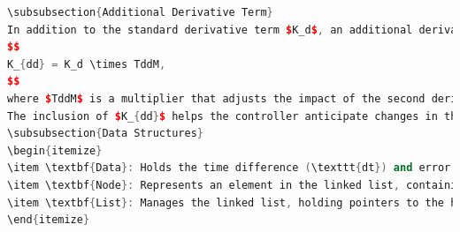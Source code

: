\documentclass[a4paper,12pt]{article}
\begin{document}
\begin{lstlisting}[language=C++]
\subsubsection{Additional Derivative Term}
In addition to the standard derivative term $K_d$, an additional derivative term $K_{dd}$ is included in the PID controller. This term represents a second derivative component, which can be defined as follows:
$$
K_{dd} = K_d \times TddM,
$$
where $TddM$ is a multiplier that adjusts the impact of the second derivative term. \\
The inclusion of $K_{dd}$ helps the controller anticipate changes in the error more effectively. By accounting for the acceleration of the error (i.e., how the rate of error change is itself changing), this additional term enhances the damping characteristics of the controller, allowing for more refined control responses, especially in systems that are subject to rapid changes or oscillations.
\subsubsection{Data Structures}
\begin{itemize}
\item \textbf{Data}: Holds the time difference (\texttt{dt}) and error value (\texttt{e}).
\item \textbf{Node}: Represents an element in the linked list, containing \texttt{Data} and a pointer to the previous node.
\item \textbf{List}: Manages the linked list, holding pointers to the head and tail nodes and the size of the list.
\end{itemize}

\end{lstlisting}
\end{document}
